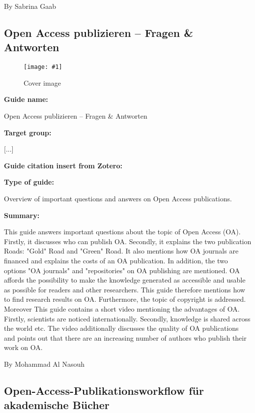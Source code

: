 \documentclass{article}
\newlength{\imgwidth}
\newcommand\scaledgraphics[2]{%
                
\settowidth{\imgwidth}{\texttt{[image: \#1]}}%
                
\setlength{\imgwidth}{\minof{\imgwidth}{#2\textwidth}}%
                
\texttt{[image: \#1]}%
                
}
\begin{document}
By Sabrina Gaab 





\subsection{Open Access publizieren – Fragen \& Antworten}\label{H4741497}


\begin{figure}
\scaledgraphics{f61a96b6-6ada-4caf-b8f3-1ef6ac943b93.png}{1}
\caption*{Cover image}\label{F90452781}
\end{figure}




\textbf{Guide name:} 

Open Access publizieren – Fragen \& Antworten


\textbf{Target group:}

[...]


\textbf{Guide citation insert from Zotero:}

\autocite{bundesministerium_fur_bildung_und_forschung_open_2021}


\textbf{Type of guide:}

Overview of important questions and answers on Open Access publications.


\textbf{Summary:}

This guide answers important questions about the topic of Open Access (OA). Firstly, it discusses who can publish OA. Secondly, it explains the two publication Roads: "Gold" Road and "Green" Road. It also mentions how OA journals are financed and explains the costs of an OA publication. In addition, the two options "OA journals" and "repositories" on OA publishing are mentioned. OA affords the possibility to make the knowledge generated as accessible and usable as possible for readers and other researchers. This guide therefore mentions how to find research results on OA. Furthermore, the topic of copyright is addressed. Moreover This guide contains a short video mentioning the advantages of OA. Firstly, scientists are noticed internationally. Secondly, knowledge is shared across the world etc. The video additionally discusses the quality of OA publications and points out that there are an increasing number of authors who publish their work on OA.


By Mohammad Al Nasouh 





\subsection{Open-Access-Publikationsworkflow für akademische Bücher}\label{H6691479}
\end{document}
